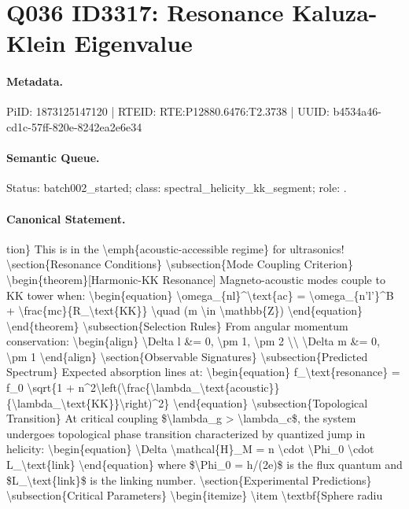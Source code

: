 \section*{Q036 ID3317: Resonance Kaluza-Klein Eigenvalue}
\paragraph{Metadata.}
PiID: 1873125147120 | RTEID: RTE:P12880.6476:T2.3738 | UUID: b4534a46-cd1c-57ff-820e-8242ea2e6e34

\paragraph{Semantic Queue.}
Status: batch002\_started; class: spectral\_helicity\_kk\_segment; role: .

\paragraph{Canonical Statement.}
tion\} This is in the \textbackslash{}emph\{acoustic-accessible regime\} for ultrasonics! \textbackslash{}section\{Resonance Conditions\} \textbackslash{}subsection\{Mode Coupling Criterion\} \textbackslash{}begin\{theorem\}[Harmonic-KK Resonance] Magneto-acoustic modes couple to KK tower when: \textbackslash{}begin\{equation\} \textbackslash{}omega\_\{nl\}\textasciicircum{}\textbackslash{}text\{ac\} = \textbackslash{}omega\_\{n'l'\}\textasciicircum{}B + \textbackslash{}frac\{mc\}\{R\_\textbackslash{}text\{KK\}\} \textbackslash{}quad (m \textbackslash{}in \textbackslash{}mathbb\{Z\}) \textbackslash{}end\{equation\} \textbackslash{}end\{theorem\} \textbackslash{}subsection\{Selection Rules\} From angular momentum conservation: \textbackslash{}begin\{align\} \textbackslash{}Delta l \&= 0, \textbackslash{}pm 1, \textbackslash{}pm 2 \textbackslash{}\textbackslash{} \textbackslash{}Delta m \&= 0, \textbackslash{}pm 1 \textbackslash{}end\{align\} \textbackslash{}section\{Observable Signatures\} \textbackslash{}subsection\{Predicted Spectrum\} Expected absorption lines at: \textbackslash{}begin\{equation\} f\_\textbackslash{}text\{resonance\} = f\_0 \textbackslash{}sqrt\{1 + n\textasciicircum{}2\textbackslash{}left(\textbackslash{}frac\{\textbackslash{}lambda\_\textbackslash{}text\{acoustic\}\}\{\textbackslash{}lambda\_\textbackslash{}text\{KK\}\}\textbackslash{}right)\textasciicircum{}2\} \textbackslash{}end\{equation\} \textbackslash{}subsection\{Topological Transition\} At critical coupling \$\textbackslash{}lambda\_g > \textbackslash{}lambda\_c\$, the system undergoes topological phase transition characterized by quantized jump in helicity: \textbackslash{}begin\{equation\} \textbackslash{}Delta \textbackslash{}mathcal\{H\}\_M = n \textbackslash{}cdot \textbackslash{}Phi\_0 \textbackslash{}cdot L\_\textbackslash{}text\{link\} \textbackslash{}end\{equation\} where \$\textbackslash{}Phi\_0 = h/(2e)\$ is the flux quantum and \$L\_\textbackslash{}text\{link\}\$ is the linking number. \textbackslash{}section\{Experimental Predictions\} \textbackslash{}subsection\{Critical Parameters\} \textbackslash{}begin\{itemize\} \textbackslash{}item \textbackslash{}textbf\{Sphere radiu

